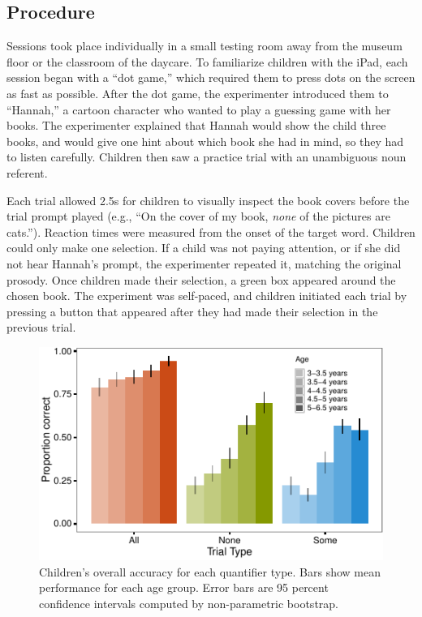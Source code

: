 \documentclass[10pt, letterpaper]{article}
\newenvironment{CodeChunk}{}{}
\begin{document}
\subsection{Procedure}\label{procedure}

Sessions took place individually in a small testing room away from the
museum floor or the classroom of the daycare. To familiarize children
with the iPad, each session began with a ``dot game,'' which required
them to press dots on the screen as fast as possible. After the dot
game, the experimenter introduced them to ``Hannah,'' a cartoon
character who wanted to play a guessing game with her books. The
experimenter explained that Hannah would show the child three books, and
would give one hint about which book she had in mind, so they had to
listen carefully. Children then saw a practice trial with an unambiguous
noun referent.

Each trial allowed 2.5s for children to visually inspect the book covers
before the trial prompt played (e.g., ``On the cover of my book,
\emph{none} of the pictures are cats.''). Reaction times were measured
from the onset of the target word. Children could only make one
selection. If a child was not paying attention, or if she did not hear
Hannah's prompt, the experimenter repeated it, matching the original
prosody. Once children made their selection, a green box appeared around
the chosen book. The experiment was self-paced, and children initiated
each trial by pressing a button that appeared after they had made their
selection in the previous trial.

\begin{CodeChunk}
\begin{figure}[t]
\includegraphics{figs/overall_acc-1} \caption[Children's overall accuracy for each quantifier type]{Children's overall accuracy for each quantifier type. Bars show mean performance for each age group. Error bars are 95 percent confidence intervals computed by non-parametric bootstrap.}\label{fig:overall_acc}
\end{figure}
\end{CodeChunk}
\end{document}
